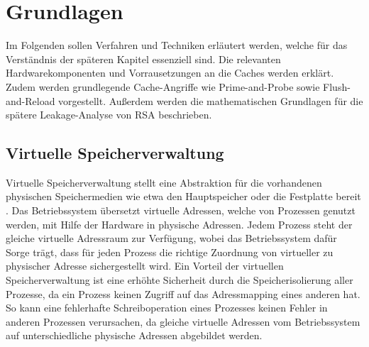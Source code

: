 \chapter{Grundlagen}
\label{chapter:basics}

Im Folgenden sollen Verfahren und Techniken %
erläutert werden, welche für das Verständnis der späteren Kapitel essenziell sind.
Die relevanten Hardwarekomponenten und Vorrausetzungen an die Caches werden erklärt.
Zudem werden grundlegende Cache-Angriffe wie Prime-and-Probe sowie Flush-and-Reload vorgestellt.
Außerdem werden die mathematischen Grundlagen für die spätere Leakage-Analyse von RSA beschrieben.

\section{Virtuelle Speicherverwaltung}


Virtuelle Speicherverwaltung stellt eine Abstraktion für die vorhandenen physischen Speichermedien wie etwa den Hauptspeicher oder die Festplatte bereit \cite{tanenbaumVirtualMemory}.
Das Betriebssystem übersetzt virtuelle Adressen, welche von Prozessen genutzt werden, mit Hilfe der Hardware in physische Adressen. 
Jedem Prozess steht der gleiche virtuelle Adressraum zur Verfügung, wobei das Betriebssystem dafür Sorge trägt, dass für jeden Prozess die richtige Zuordnung von virtueller zu physischer Adresse sichergestellt wird.
Ein Vorteil der virtuellen Speicherverwaltung ist eine erhöhte Sicherheit durch die Speicherisolierung aller Prozesse, da ein Prozess keinen Zugriff auf das Adressmapping eines anderen hat.
So kann eine fehlerhafte Schreiboperation eines Prozesses keinen Fehler in anderen Prozessen verursachen, da gleiche virtuelle Adressen vom Betriebssystem auf unterschiedliche physische Adressen abgebildet werden.

